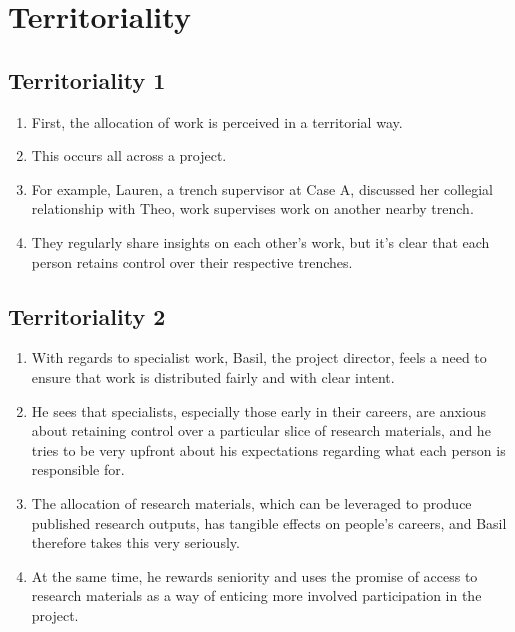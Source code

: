 \documentclass{article}
\begin{document}
\section{Territoriality}
\subsection{Territoriality 1}
\begin{enumerate}
  \item First, the allocation of work is perceived in a territorial way.
  \item This occurs all across a project.
  \item For example, Lauren, a trench supervisor at Case A, discussed her collegial relationship with Theo, work supervises work on another nearby trench.
  \item They regularly share insights on each other's work, but it's clear that each person retains control over their respective trenches.
  
\end{enumerate}

\subsection{Territoriality 2}
\begin{enumerate}
  \item With regards to specialist work, Basil, the project director, feels a need to ensure that work is distributed fairly and with clear intent.
  \item He sees that specialists, especially those early in their careers, are anxious about retaining control over a particular slice of research materials, and he tries to be very upfront about his expectations regarding what each person is responsible for.
  \item The allocation of research materials, which can be leveraged to produce published research outputs, has tangible effects on people's careers, and Basil therefore takes this very seriously.
  \item At the same time, he rewards seniority and uses the promise of access to research materials as a way of enticing more involved participation in the project.
  
\end{enumerate}
  
\end{document}
